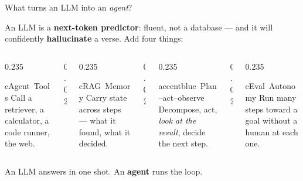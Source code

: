 \begin{frame}{What turns an LLM into an \emph{agent}?}
  \begin{center}\small
  An LLM is a \textbf{next-token predictor}: fluent, not a database ---
  and it will confidently \textbf{hallucinate} a verse. Add four things:
  \end{center}
  \vspace{4pt}
  \begin{columns}[t, totalwidth=\textwidth]
    \begin{column}{0.235\textwidth}
      \begin{featbox}{cAgent}{\faTools\ Tools}
        \scriptsize Call a retriever, a calculator, a code runner, the web.
      \end{featbox}
    \end{column}
    \begin{column}{0.02\textwidth}\end{column}
    \begin{column}{0.235\textwidth}
      \begin{featbox}{cRAG}{\faBrain\ Memory}
        \scriptsize Carry state across steps --- what it found, what it decided.
      \end{featbox}
    \end{column}
    \begin{column}{0.02\textwidth}\end{column}
    \begin{column}{0.235\textwidth}
      \begin{featbox}{accentblue}{\faSync\ Plan--act--observe}
        \scriptsize Decompose, act, \emph{look at the result}, decide the next step.
      \end{featbox}
    \end{column}
    \begin{column}{0.02\textwidth}\end{column}
    \begin{column}{0.235\textwidth}
      \begin{featbox}{cEval}{\faCompass\ Autonomy}
        \scriptsize Run many steps toward a goal without a human at each one.
      \end{featbox}
    \end{column}
  \end{columns}
  \vspace{10pt}
  \begin{center}\small\color{labnavy}An LLM answers in one shot. An \textbf{agent} runs the loop.\end{center}
\end{frame}

